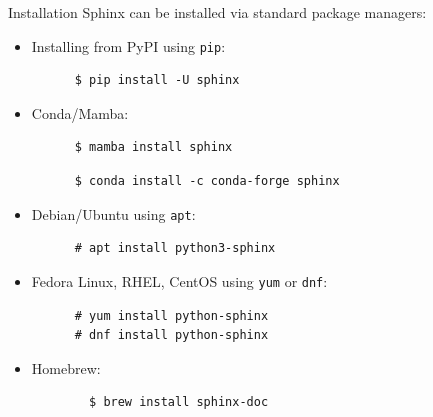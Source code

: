 \begin{frame}[fragile]{Installation}
  Sphinx can be installed via standard package managers:
  \begin{itemize}
    \setlength{\itemsep}{1em}
    \item Installing from PyPI using \texttt{pip}:
    \begin{verbatim}
      $ pip install -U sphinx
    \end{verbatim}
    \item Conda/Mamba:
    \begin{verbatim}
      $ mamba install sphinx
    \end{verbatim}
    \begin{verbatim}
      $ conda install -c conda-forge sphinx
    \end{verbatim}

    \item Debian/Ubuntu using \texttt{apt}:
    \begin{verbatim}
      # apt install python3-sphinx
    \end{verbatim}

  \item Fedora Linux, RHEL, CentOS using \texttt{yum} or \texttt{dnf}:
    \begin{verbatim}
      # yum install python-sphinx
      # dnf install python-sphinx
    \end{verbatim}

    \item Homebrew:
      \begin{verbatim}
        $ brew install sphinx-doc
      \end{verbatim}
  \end{itemize}
\end{frame}

